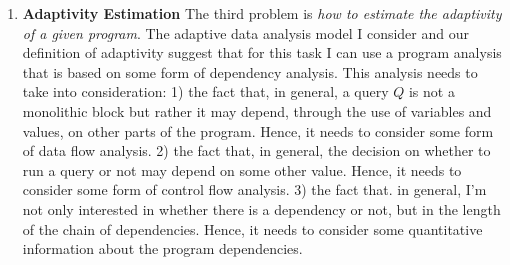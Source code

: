 \begin{enumerate}
   \item 
\textbf{Adaptivity Estimation}
The third problem is \emph{how to estimate the adaptivity of a given program}. 
The adaptive data analysis model I consider and our definition of adaptivity suggest that for this task I can use a program analysis that is based on some form of dependency analysis. This analysis needs to take into consideration:
1) the fact that, in general, a query $Q$ is not a monolithic block but rather it may depend, through the use of variables and values, on other parts of the program. 
Hence, it needs to consider some form of data flow analysis. 
2) the fact that, in general, the decision on whether to run a query or not may depend on some other value. Hence, 
 it needs to consider some form of control flow analysis.
3) the fact that. in general, I'm not only interested in whether there is a dependency or not, but in the length of the chain of dependencies. 
Hence, it needs to consider some quantitative information about the program dependencies. %


\end{enumerate}
